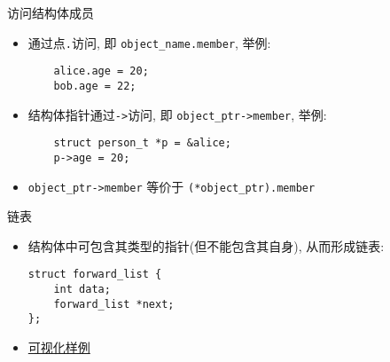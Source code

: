 \begin{frame}[fragile]{访问结构体成员}
    \begin{itemize}[<+- | alert@+>]
        \item 通过点\texttt{.}访问, 即 \texttt{object\_name.member}, 举例:
        \begin{verbatim}
    alice.age = 20;
    bob.age = 22;
        \end{verbatim}
        \item 结构体指针通过\texttt{->}访问, 即 \texttt{object\_ptr->member}, 举例:
        \begin{verbatim}
    struct person_t *p = &alice;
    p->age = 20;
        \end{verbatim}
        \item \texttt{object\_ptr->member} 等价于 \texttt{(*object\_ptr).member}
    \end{itemize}
\end{frame}

\begin{frame}[fragile]{链表}
    \begin{itemize}[<+- | alert@+>]
        \item 结构体中可包含其类型的指针(但不能包含其自身), 从而形成链表:
        \begin{verbatim}
struct forward_list {
    int data;
    forward_list *next;
};
        \end{verbatim}
        \item \href{http://pythontutor.com/c.html#code=\%23include\%20\%3Cstdio.h\%3E\%0A\%23include\%20\%3Cstdlib.h\%3E\%0A\%0Astruct\%20forward_list\%20\%7B\%0A\%20\%20int\%20data\%3B\%0A\%20\%20struct\%20forward_list\%20*next\%3B\%0A\%7D\%20_head,\%20*head\%20\%3D\%20\%26_head,\%20*tail\%20\%3D\%20\%26_head\%3B\%0A\%0Atypedef\%20struct\%20forward_list\%20forward_list\%3B\%0A\%0Aint\%20main\%28\%29\%20\%7B\%0A\%20\%20for\%20\%28int\%20i\%20\%3D\%200\%3B\%20i\%20\%3C\%203\%3B\%20\%2B\%2Bi\%29\%20\%7B\%0A\%20\%20\%20\%20tail-\%3Enext\%20\%3D\%20\%28forward_list\%20*\%29malloc\%28sizeof\%28forward_list\%29\%29\%3B\%0A\%20\%20\%20\%20tail\%20\%3D\%20tail-\%3Enext\%3B\%0A\%20\%20\%20\%20tail-\%3Edata\%20\%3D\%20i\%3B\%0A\%20\%20\%20\%20tail-\%3Enext\%20\%3D\%20NULL\%3B\%0A\%20\%20\%7D\%0A\%20\%20for\%20\%28forward_list\%20*p\%20\%3D\%20head-\%3Enext,\%20*q\%20\%3D\%20p\%3B\%20p\%20!\%3D\%20NULL\%3B\%20q\%20\%3D\%20p\%29\%20\%7B\%0A\%20\%20\%20\%20printf\%28\%22\%25d\%5Cn\%22,\%20p-\%3Edata\%29\%3B\%0A\%20\%20\%20\%20p\%20\%3D\%20p-\%3Enext\%3B\%0A\%20\%20\%20\%20free\%28q\%29\%3B\%0A\%20\%20\%20\%20head-\%3Enext\%20\%3D\%20p\%3B\%0A\%20\%20\%20\%20if\%20\%28tail\%20\%3D\%3D\%20q\%29\%0A\%20\%20\%20\%20\%20\%20tail\%20\%3D\%20head\%3B\%0A\%20\%20\%7D\%0A\%7D&mode=edit&origin=opt-frontend.js&py=c&rawInputLstJSON=\%5B\%5D}{可视化样例}
    \end{itemize}
\end{frame}

